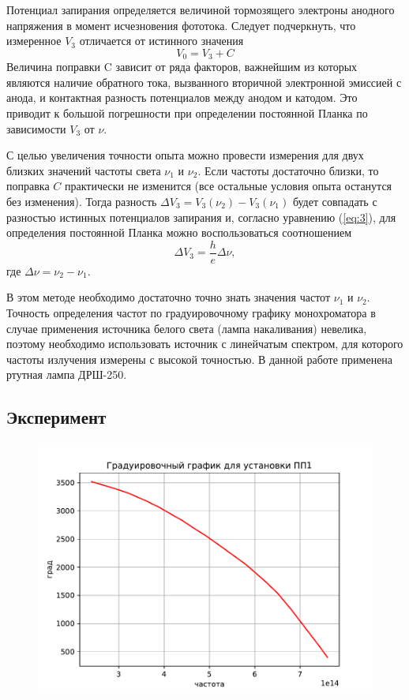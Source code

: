 Потенциал запирания определяется величиной тормозящего электроны анодного напряжения в момент исчезновения фототока. Следует подчеркнуть, что измеренное $V_{3}$ отличается от истинного значения
\begin{equation}
	V_0=V_{3}+C
\end{equation}
Величина поправки C зависит от ряда факторов, важнейшим из которых являются наличие обратного тока, вызванного вторичной электронной эмиссией с анода, и контактная разность потенциалов между анодом и катодом. Это приводит к большой погрешности 
при определении постоянной Планка по зависимости $V_{3}$ от $\nu$.

С целью увеличения точности опыта можно провести измерения для двух близких значений частоты света $\nu_1$ и $\nu_2$. Если частоты достаточно близки, то поправка $C$ практически не изменится (все остальные условия опыта останутся без изменения). Тогда разность $\Delta V_{3} = V_{3}(\nu_2)- V_{3}(\nu_1)$ будет совпадать с разностью истинных потенциалов запирания и, согласно уравнению (\ref{eq:3}), для определения постоянной Планка можно воспользоваться соотношением
\begin{equation}
	\Delta V_{3}=\frac he \Delta \nu,
\end{equation}
где $\Delta \nu= \nu_2- \nu_1$.

В этом методе необходимо достаточно точно знать значения частот $\nu_1$ и $\nu_2$. Точность определения частот по градуировочному графику монохроматора в случае применения источника белого света (лампа накаливания) невелика, поэтому необходимо использовать источник с линейчатым спектром, для которого частоты излучения измерены с высокой точностью. В данной работе применена ртутная лампа ДРШ-250. 

\subsection{Эксперимент}
\begin{figure}[H]
	\centering
	\includegraphics[scale=1]{scripts/Gradgraph.pdf}
	\caption{}
	\label{fig:3}
\end{figure}

